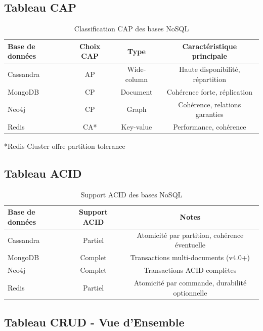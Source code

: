 \documentclass[11pt,a4paper]{article}
\begin{document}
\subsection{Tableau CAP}

\begin{table}[h]
\centering
\begin{tabular}{|l|c|c|c|}
\hline
\textbf{Base de données} & \textbf{Choix CAP} & \textbf{Type} & \textbf{Caractéristique principale} \\
\hline
Cassandra & AP & Wide-column & Haute disponibilité, répartition \\
\hline
MongoDB & CP & Document & Cohérence forte, réplication \\
\hline
Neo4j & CP & Graph & Cohérence, relations garanties \\
\hline
Redis & CA* & Key-value & Performance, cohérence \\
\hline
\end{tabular}
\caption{Classification CAP des bases NoSQL}
\end{table}

*Redis Cluster offre partition tolerance

\subsection{Tableau ACID}

\begin{table}[h]
\centering
\begin{tabular}{|l|c|c|}
\hline
\textbf{Base de données} & \textbf{Support ACID} & \textbf{Notes} \\
\hline
Cassandra & Partiel & Atomicité par partition, cohérence éventuelle \\
\hline
MongoDB & Complet & Transactions multi-documents (v4.0+) \\
\hline
Neo4j & Complet & Transactions ACID complètes \\
\hline
Redis & Partiel & Atomicité par commande, durabilité optionnelle \\
\hline
\end{tabular}
\caption{Support ACID des bases NoSQL}
\end{table}

\subsection{Tableau CRUD - Vue d'Ensemble}
\end{document}
